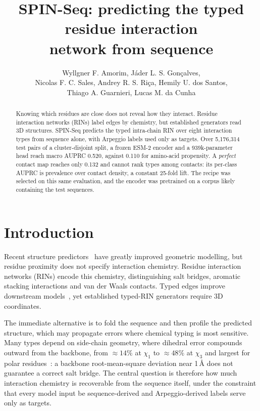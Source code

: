 \documentclass[12pt]{article}
\title{SPIN-Seq: predicting the typed residue interaction\\
network from sequence}
\author{Wyllgner F. Amorim\inst{1}, Jáder L. S. Gonçalves\inst{2},\\
  Nicolas F. C. Sales\inst{3}, Andrey R. S. Riça\inst{3},
  Hemily U. dos Santos\inst{3},\\
  Thiago A. Guarnieri\inst{3}, Lucas M. da Cunha\inst{3}}
\begin{document}
\maketitle

\begin{abstract}
  Knowing which residues are close does not reveal how they interact. Residue interaction
  networks (RINs) label edges by chemistry, but established generators read 3D structures.
  SPIN-Seq predicts the typed intra-chain RIN over eight interaction types from sequence
  alone, with Arpeggio labels used only as targets. Over 5{,}176{,}314 test pairs of a
  cluster-disjoint split, a frozen ESM-2 encoder and a 939k-parameter head reach macro
  AUPRC 0.520, against 0.110 for amino-acid propensity. A \emph{perfect} contact map
  reaches only 0.132 and cannot rank types among contacts: its per-class AUPRC is
  prevalence over contact density, a constant 25-fold lift. The recipe was selected on
  this same evaluation, and the encoder was pretrained on a corpus likely containing the
  test sequences.
\end{abstract}


\section{Introduction}
\label{sec:intro}

Recent structure predictors~\cite{jumper2021alphafold,lin2023esm2} have greatly improved
geometric modelling, but residue proximity does not specify interaction chemistry. Residue interaction networks (RINs) encode this chemistry,
distinguishing salt bridges, aromatic stacking interactions and van der Waals contacts.
Typed edges improve downstream models~\cite{rithetge2026}, yet established typed-RIN
generators require 3D coordinates.

The immediate alternative is to fold the sequence and then profile the predicted
structure, which may propagate errors where chemical typing is most sensitive. Many types
depend on side-chain geometry, where dihedral error compounds outward from the backbone,
from ${\approx}14\%$ at $\chi_1$ to ${\approx}48\%$ at $\chi_3$ and largest for polar
residues~\cite{biophysj2025sidechains}: a backbone root-mean-square deviation near
1\,\AA{} does not guarantee a correct salt bridge. The central question is therefore how
much interaction chemistry is recoverable from the sequence itself, under the constraint
that every model input be sequence-derived and Arpeggio-derived labels serve only as
targets.
\end{document}
